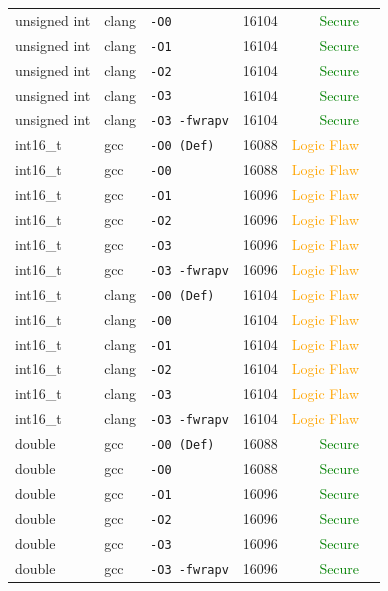 \begin{table}[htbp]
\begin{tabular}{@{}lllcrl@{}}
unsigned int & clang & \texttt{-O0} & 16104 & \textcolor{green}{Secure}} \\
unsigned int & clang & \texttt{-O1} & 16104 & \textcolor{green}{Secure}} \\
unsigned int & clang & \texttt{-O2} & 16104 & \textcolor{green}{Secure}} \\
unsigned int & clang & \texttt{-O3} & 16104 & \textcolor{green}{Secure}} \\
unsigned int & clang & \texttt{-O3 -fwrapv} & 16104 & \textcolor{green}{Secure}} \\
\midrule
int16_t & gcc & \texttt{-O0 (Def)} & 16088 & \textcolor{orange}{Logic Flaw} \\
int16_t & gcc & \texttt{-O0} & 16088 & \textcolor{orange}{Logic Flaw} \\
int16_t & gcc & \texttt{-O1} & 16096 & \textcolor{orange}{Logic Flaw} \\
int16_t & gcc & \texttt{-O2} & 16096 & \textcolor{orange}{Logic Flaw} \\
int16_t & gcc & \texttt{-O3} & 16096 & \textcolor{orange}{Logic Flaw} \\
int16_t & gcc & \texttt{-O3 -fwrapv} & 16096 & \textcolor{orange}{Logic Flaw} \\
int16_t & clang & \texttt{-O0 (Def)} & 16104 & \textcolor{orange}{Logic Flaw} \\
int16_t & clang & \texttt{-O0} & 16104 & \textcolor{orange}{Logic Flaw} \\
int16_t & clang & \texttt{-O1} & 16104 & \textcolor{orange}{Logic Flaw} \\
int16_t & clang & \texttt{-O2} & 16104 & \textcolor{orange}{Logic Flaw} \\
int16_t & clang & \texttt{-O3} & 16104 & \textcolor{orange}{Logic Flaw} \\
int16_t & clang & \texttt{-O3 -fwrapv} & 16104 & \textcolor{orange}{Logic Flaw} \\
\midrule
double & gcc & \texttt{-O0 (Def)} & 16088 & \textcolor{green}{Secure}} \\
double & gcc & \texttt{-O0} & 16088 & \textcolor{green}{Secure}} \\
double & gcc & \texttt{-O1} & 16096 & \textcolor{green}{Secure}} \\
double & gcc & \texttt{-O2} & 16096 & \textcolor{green}{Secure}} \\
double & gcc & \texttt{-O3} & 16096 & \textcolor{green}{Secure}} \\
double & gcc & \texttt{-O3 -fwrapv} & 16096 & \textcolor{green}{Secure}} \\

\end{tabular}
\end{table}
